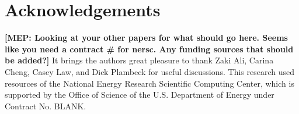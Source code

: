 \documentclass[twocolumn,apj,numberedappendix]{emulateapj}
\newcommand{\N}{\mathbf{N}}
\newcommand{\acl}[1]{{\color{red} \textbf{[ACL:  #1]}}}
\newcommand{\mep}[1]{{\color{applegreen} \textbf{[MEP:  #1]}}}
\begin{document}
%

\section{Acknowledgements}
\mep{Looking at your other papers for what should go here. Seems like you need a contract \# for nersc. Any funding sources that should be added?}
It brings the authors great pleasure to thank Zaki Ali, Carina Cheng, Casey Law, and Dick Plambeck for useful discussions. This research used resources of the National Energy Research Scientific Computing Center, which is supported by the Office of Science of the U.S. Department of Energy under Contract No. BLANK. 
\end{document}
